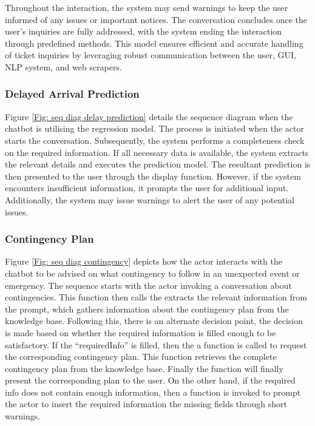 \noindent
Throughout the interaction, the system may send warnings to keep the user informed of any issues or important notices. The conversation concludes once the user's inquiries are fully addressed, with the system ending the interaction through predefined methods. This model ensures efficient and accurate handling of ticket inquiries by leveraging robust communication between the user, GUI, NLP system, and web scrapers.

\subsubsection*{Delayed Arrival Prediction}
Figure \ref{Fig: seq diag delay prediction} details the sequence diagram when the chatbot is utilising the regression model. The process is initiated when the actor starts the conversation. Subsequently, the system performs a completeness check on the required information. If all necessary data is available, the system extracts the relevant details and executes the prediction model. The resultant prediction is then presented to the user through the display function. However, if the system encounters insufficient information, it prompts the user for additional input. Additionally, the system may issue warnings to alert the user of any potential issues.

\subsubsection*{Contingency Plan}
Figure \ref{Fig: seq diag contingency} depicts how the actor interacts with the chatbot to be advised on what contingency to follow in an unexpected event or emergency. The sequence starts with the actor invoking a conversation about contingencies. This function then calls the extracts the relevant information from the prompt, which gathers information about the contingency plan from the knowledge base. Following this, there is an alternate decision point, the decision is made based on whether the required information is filled enough to be satisfactory.
If the ``requiredInfo'' is filled, then the a function is called to request the corresponding contingency plan. This function retrieves the complete contingency plan from the knowledge base. Finally the function will finally present the corresponding plan to the user. On the other hand, if the required info does not contain enough information, then a function is invoked to prompt the actor to insert the required information the missing fields through short warnings.

